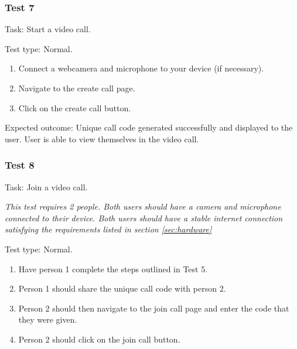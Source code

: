 \subsubsection{Test 7}

{\sffamily Task:} Start a video call.\\ 

{\color{gray} \hrulefill}

{\sffamily Test type: Normal.}\\

\begin{enumerate}
  \item Connect a webcamera and microphone to your device (if necessary).
  \item Navigate to the create call page.
  \item Click on the create call button.
\end{enumerate}

{\sffamily Expected outcome:} Unique call code generated successfully 
and displayed to the user. User is able to view themselves in 
the video call.\\

{\color{gray} \hrulefill}

\vspace{0.2cm}

\subsubsection{Test 8}

{\sffamily Task:} Join a video call.\\ \vspace{0.2cm}

\textit{This test requires 2 people. Both users should have a camera 
and microphone connected to their device. Both users should have a 
stable internet connection satisfying the requirements listed in section \ref{sec:hardware}}\\

{\color{gray} \hrulefill}

{\sffamily Test type: Normal.}\\

\begin{enumerate}
  \item Have person 1 complete the steps outlined in Test 5.
  \item Person 1 should share the unique call code with person 2.
  \item Person 2 should then navigate to the join call page and enter the code that they were given.
  \item Person 2 should click on the join call button.
\end{enumerate}

